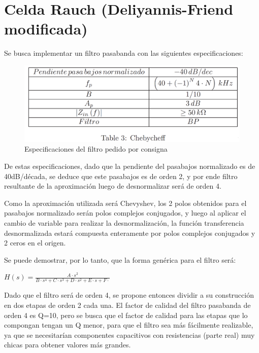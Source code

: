 \documentclass[../../tc_tp5_main.tex]{subfiles}
\begin{document}
\chapter{Celda Rauch (Deliyannis-Friend modificada)}
Se busca implementar un filtro pasabanda con las siguientes especificaciones:\par

\begin{figure}[H]	%
	\centering
	\includegraphics[scale=0.5]{imagenes/especificaciones.png}
	\caption{Especificaciones del filtro pedido por consigna}
	\label{fig:ej2_especificaciones}
\end{figure}

De estas especificaciones, dado que la pendiente del pasabajos normalizado es de 40dB/década, se deduce que este pasabajos es de orden 2, y por ende filtro resultante de la aproximación luego de desnormalizar será de orden 4. \par
Como la aproximación utilizada será Chevyshev, los 2 polos obtenidos para el pasabajos normalizado serán polos complejos conjugados, y luego al aplicar el cambio de variable para realizar la desnormalización, la función transferencia desnormalizada estará compuesta enteramente por polos complejos conjugados y 2 ceros en el origen.\par
Se puede demostrar, por lo tanto, que la forma genérica para el filtro será:\par

\begin{centering}
$ H(s) = \frac{A\cdot s^2}{B\cdot s^4 + C \cdot s^3 + D\cdot s^2 + E\cdot s + F \cdot}$\par
\end{centering}

Dado que el filtro será de orden 4, se propone entonces dividir a su construcción en dos etapas de orden 2 cada una. El factor de calidad del filtro pasabanda de orden 4 es Q=10, pero se busca que el factor de calidad para las etapas que lo compongan tengan un Q menor, para que el filtro sea más fácilmente realizable, ya que se necesitarían componentes capacitivos con resistencias (parte real) muy chicas para obtener valores más grandes.\par
 
\end{document}
